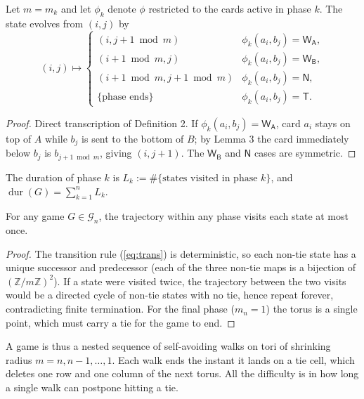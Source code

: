 \documentclass[12pt]{article}
\DeclareMathOperator{\dur}{dur}
\newcommand{\WA}{\mathsf{W_A}}
\newcommand{\WB}{\mathsf{W_B}}
\newcommand{\TT}{\mathsf{T}}
\newcommand{\NN}{\mathsf{N}}
\begin{document}
\begin{lemma} Let $m=m_k$ and let $\phi_k$ denote $\phi$ restricted to the cards active in phase $k$. The state evolves from $(i,j)$ by
\begin{equation}\label{eq:trans}
(i,j)\mapsto
\begin{cases}
(i, j + 1 \bmod m) & \phi_k(a_i,b_j)=\WA, \\
(i + 1 \bmod m, j) & \phi_k(a_i,b_j)=\WB, \\
(i + 1 \bmod m, j + 1 \bmod m) & \phi_k(a_i,b_j)=\NN, \\
\{\text{phase ends}\} & \phi_k(a_i,b_j)=\TT.
\end{cases}
\end{equation}
\end{lemma}
\begin{proof}
Direct transcription of Definition 2. If $\phi_k(a_i,b_j)=\WA$, card $a_i$ stays on top of $A$ while $b_j$ is sent to the bottom of $B$; by Lemma 3 the card immediately below $b_j$ is $b_{j+1 \bmod m}$, giving $(i, j+1)$. The $\WB$ and $\NN$ cases are symmetric.
\end{proof}

The duration of phase $k$ is $L_k:=\#\{\text{states visited in phase } k\}$, and $\dur(G)=\sum_{k=1}^n L_k$.

\begin{lemma} For any game $G\in\mathcal{G}_n$, the trajectory within any phase visits each state at most once.
\end{lemma}
\begin{proof}
The transition rule (\ref{eq:trans}) is deterministic, so each non-tie state has a unique successor and predecessor (each of the three non-tie maps is a bijection of $(\mathbb{Z}/m\mathbb{Z})^2$). If a state were visited twice, the trajectory between the two visits would be a directed cycle of non-tie states with no tie, hence repeat forever, contradicting finite termination. For the final phase ($m_n=1$) the torus is a single point, which must carry a tie for the game to end.
\end{proof}

\begin{remark} A game is thus a nested sequence of self-avoiding walks on tori of shrinking radius $m=n,n-1,\dots,1$. Each walk ends the instant it lands on a tie cell, which deletes one row and one column of the next torus. All the difficulty is in how long a single walk can postpone hitting a tie.
\end{remark}
\end{document}
